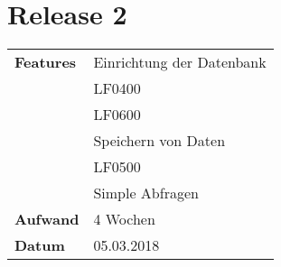 
\section*{Release 2}
\label{sec:release_2}

\begin{tabular}{p{5cm} p{9cm}}
    \textbf{Features} & Einrichtung der Datenbank \\
    & \hspace{8pt} LF0400 \\
    & \hspace{8pt} LF0600 \\
    & Speichern von Daten \\
    & \hspace{8pt} LF0500 \\
    & Simple Abfragen  \\
    \hline
    \textbf{Aufwand} & 4 Wochen\\
    \hline
    \textbf{Datum} & 05.03.2018
\end{tabular}
